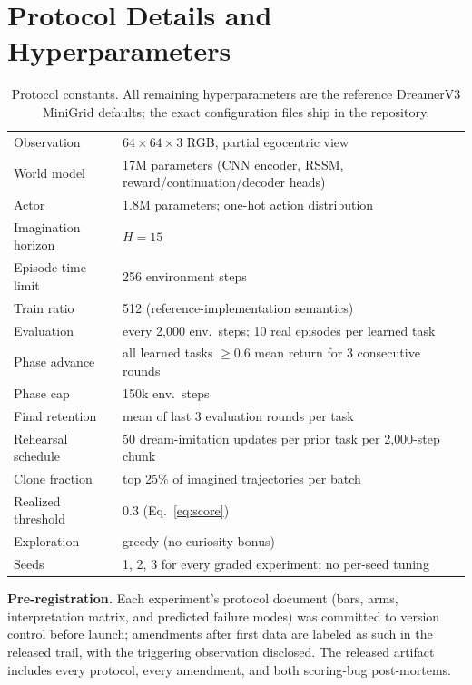 \documentclass[10pt]{article}
\begin{document}
\appendix

\section{Protocol Details and Hyperparameters}
\label{app:hyper}

\begin{table}[h]
\centering
\small
\begin{tabular}{ll}
\toprule
Observation & $64 \times 64 \times 3$ RGB, partial egocentric view \\
World model & 17M parameters (CNN encoder, RSSM, reward/continuation/decoder heads) \\
Actor & 1.8M parameters; one-hot action distribution \\
Imagination horizon & $H = 15$ \\
Episode time limit & 256 environment steps \\
Train ratio & 512 (reference-implementation semantics) \\
Evaluation & every 2{,}000 env.\ steps; 10 real episodes per learned task \\
Phase advance & all learned tasks $\geq 0.6$ mean return for 3 consecutive rounds \\
Phase cap & 150k env.\ steps \\
Final retention & mean of last 3 evaluation rounds per task \\
Rehearsal schedule & 50 dream-imitation updates per prior task per 2{,}000-step chunk \\
Clone fraction & top 25\% of imagined trajectories per batch \\
Realized threshold & 0.3 (Eq.~\ref{eq:score}) \\
Exploration & greedy (no curiosity bonus) \\
Seeds & 1, 2, 3 for every graded experiment; no per-seed tuning \\
\bottomrule
\end{tabular}
\caption{Protocol constants. All remaining hyperparameters are the reference DreamerV3
MiniGrid defaults; the exact configuration files ship in the repository.}
\label{tab:hyper}
\end{table}

\noindent \textbf{Pre-registration.} Each experiment's protocol document (bars, arms,
interpretation matrix, and predicted failure modes) was committed to version control before
launch; amendments after first data are labeled as such in the released trail, with the
triggering observation disclosed. The released artifact includes every protocol, every
amendment, and both scoring-bug post-mortems.
\end{document}
